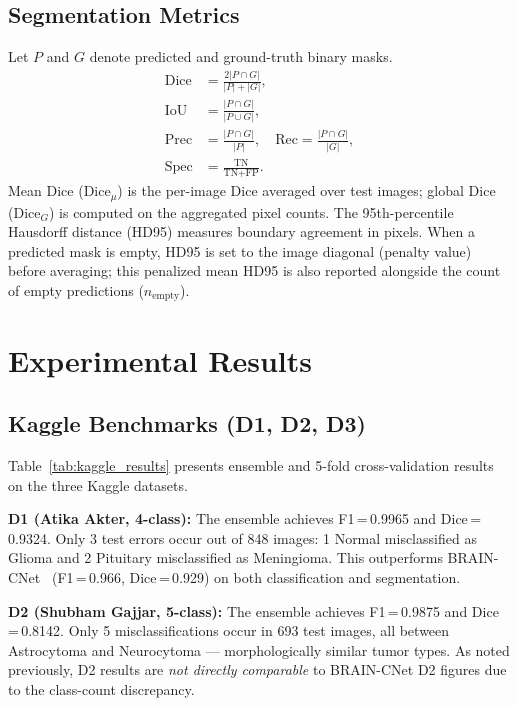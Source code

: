 \documentclass[journal]{IEEEtran}
\begin{document}
\subsection{Segmentation Metrics}
Let $P$ and $G$ denote predicted and ground-truth binary masks.
\begin{align}
  \text{Dice} &= \frac{2|P \cap G|}{|P| + |G|},  \label{eq:dice} \\
  \text{IoU}  &= \frac{|P \cap G|}{|P \cup G|},  \label{eq:iou} \\
  \text{Prec} &= \frac{|P \cap G|}{|P|}, \quad
  \text{Rec}  = \frac{|P \cap G|}{|G|},  \label{eq:prec_rec} \\
  \text{Spec} &= \frac{\text{TN}}{\text{TN}+\text{FP}}.  \label{eq:spec}
\end{align}
Mean Dice (Dice$_\mu$) is the per-image Dice averaged over test images; global
Dice (Dice$_G$) is computed on the aggregated pixel counts. The 95th-percentile
Hausdorff distance (HD95) measures boundary agreement in pixels. When a
predicted mask is empty, HD95 is set to the image diagonal (penalty value)
before averaging; this penalized mean HD95 is also reported alongside the
count of empty predictions ($n_{\text{empty}}$).

\section{Experimental Results}
\label{sec:results}

\subsection{Kaggle Benchmarks (D1, D2, D3)}
Table~\ref{tab:kaggle_results} presents ensemble and 5-fold cross-validation
results on the three Kaggle datasets.



\textbf{D1 (Atika Akter, 4-class):} The ensemble achieves F1\,=\,0.9965 and
Dice\,=\,0.9324. Only 3 test errors occur out of 848 images: 1 Normal
misclassified as Glioma and 2 Pituitary misclassified as Meningioma. This
outperforms BRAIN-CNet~\cite{musthafa2026braincnet} (F1\,=\,0.966, Dice\,=\,0.929)
on both classification and segmentation.

\textbf{D2 (Shubham Gajjar, 5-class):} The ensemble achieves F1\,=\,0.9875 and
Dice\,=\,0.8142. Only 5 misclassifications occur in 693 test images, all between
Astrocytoma and Neurocytoma — morphologically similar tumor types. As noted
previously, D2 results are \emph{not directly comparable} to BRAIN-CNet D2
figures due to the class-count discrepancy.
\end{document}

